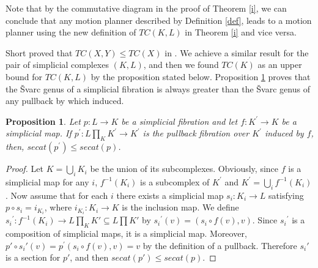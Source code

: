 \documentclass[preprint,11pt %
]{hjm1}
\newtheorem{theorem}{Theorem}[section]
\newtheorem{proposition}[theorem]{Proposition}
\theoremstyle{definition}
\begin{document}
%
%


Note that by the commutative diagram in the proof of Theorem \ref{i}, we can conclude that any motion planner described by Definition \ref{def}, leads to a motion planner using the new definition of $TC(K,L)$ in Theorem \ref{i} and vice versa. 

Short proved that $TC(X,Y)\leq TC(X)$ in \cite{rel}.  
We achieve a similar result for the pair of simplicial complexes $(K,L)$, and then we found $TC(K)$ as an upper bound for $TC(K,L)$ by the proposition stated below. Proposition \ref{a} proves that the \v{S}varc genus of a simplicial fibration  is always greater than  the \v{S}varc genus of any pullback by which induced.


\begin{proposition}\label{a} %
Let $p:L\to K$ be a simplicial fibration and let $f:K^{'}\to K$ be a simplicial map. If $p^{'}:L\prod _{K}K^{'} \to K^{'}$ is the pullback fibration over $K^{'}$ induced by $f$, then, $secat (p^{'})\leq secat (p)$.
\end{proposition} 

\begin{proof}
Let $K=\bigcup _i K_{i}$ be the union of its subcomplexes. Obviously, since $f$ is a simplicial map for any $i$, $f^{-1}(K_{i})$ is a subcomplex of $K^{'}$ and $K^{'}=\bigcup _{i}f^{-1}(K_{i})$. Now assume that for each $i$ there exists a simplicial map $s_{i}:K_i \to L$ satisfying $p\circ s_i =i _{K_i}$, where $i_{K_{i}}:K_i \to K$ is the inclusion map. We define ${s_i }^{'}:f^{-1}(K_i) \to L\prod _K K{'}  \subseteq L\prod K'$ by ${s_i}^{'}(v)=(s_i \circ f(v),v)$. Since  ${s_i}^{'}$ is a composition of simplicial maps, it is a simplicial map. Moreover,  $p{'} \circ {s_i}{'}(v)=p^{'}(s_i \circ f(v),v)=v$ by the definition of a pullback. Therefore $s_i'$ is a section for $p'$, and then $secat (p{'})\leq secat (p)$. 
\end{proof}
\end{document}
